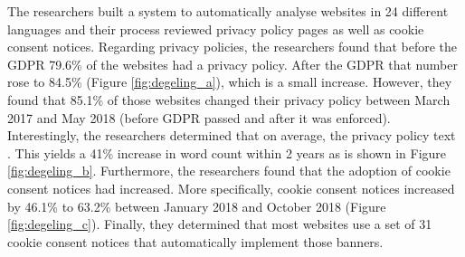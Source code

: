 \documentclass[../main.tex]{subfiles}
\begin{document}
The researchers built a system to automatically analyse websites in 24 different languages and their process reviewed privacy policy pages as well as cookie consent notices. Regarding privacy policies, the researchers found that before the GDPR 79.6\% of the websites had a privacy policy. After the GDPR that number rose to 84.5\% (Figure \ref{fig:degeling_a}), which is a small increase. However, they found that 85.1\% of those websites changed their privacy policy between March 2017 and May 2018 (before GDPR passed and after it was enforced). Interestingly, the researchers determined that on average, the privacy policy text . This yields a 41\% increase in word count within 2 years as is shown in Figure \ref{fig:degeling_b}. Furthermore, the researchers found that the adoption of cookie consent notices had increased. More specifically, cookie consent notices increased by 46.1\% to 63.2\% between January 2018 and October 2018 (Figure \ref{fig:degeling_c}). Finally, they determined that most websites use a set of 31 cookie consent notices that automatically implement those banners. 
\end{document}
